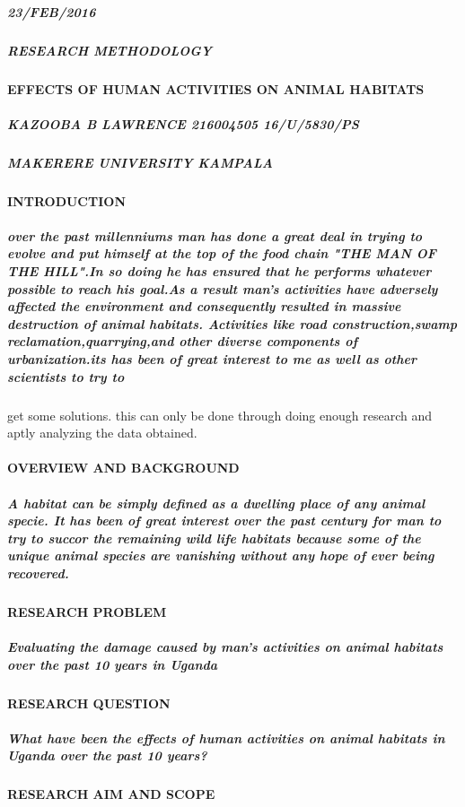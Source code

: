 \documentclass[10pt]{article}
\begin{document}
\subparagraph{23/FEB/2016}
\subparagraph{RESEARCH METHODOLOGY}
\paragraph{EFFECTS OF HUMAN ACTIVITIES ON ANIMAL HABITATS}
\subparagraph{ KAZOOBA B LAWRENCE 216004505 16/U/5830/PS}
\subparagraph{MAKERERE UNIVERSITY KAMPALA}

\paragraph{INTRODUCTION}
\subparagraph{over the past millenniums man has done a great deal in trying to evolve and put himself at the top of the food chain "THE MAN OF THE HILL".In so doing he has ensured that he performs whatever possible to reach his goal.As a result man's activities have adversely affected the environment and consequently resulted in massive destruction of animal habitats. Activities like road construction,swamp reclamation,quarrying,and other diverse components of urbanization.its has been of great interest to me as well as other scientists to try to   }
get some solutions. this can only be done through doing enough research and aptly analyzing the data obtained.

\paragraph{OVERVIEW AND BACKGROUND }

\subparagraph{
A habitat can be simply defined as a dwelling place of any animal specie.
It has been of  great interest over the past century for man to try to succor the remaining wild life habitats because some of the unique animal species are vanishing without any hope of ever being recovered.}

\paragraph{RESEARCH PROBLEM}
\subparagraph{ Evaluating the damage caused by man's activities on animal habitats over the past 10 years in Uganda}


\paragraph{RESEARCH QUESTION} 
\subparagraph{What have been the effects of human activities on animal habitats in Uganda over the past 10 years?}

\paragraph{RESEARCH AIM AND SCOPE}
\end{document}
